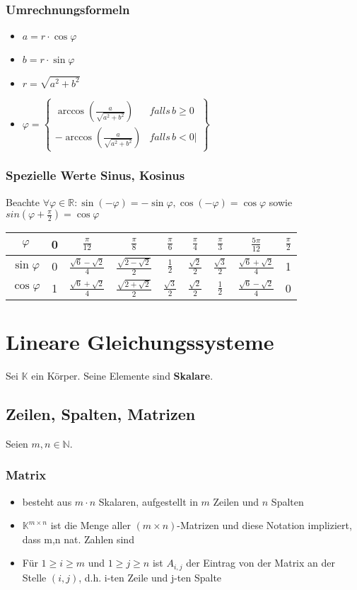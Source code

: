\documentclass[titlepage]{article}
\newcommand{\K}{\mathbb{K}}
\newcommand{\N}{\mathbb{N}}
\newcommand{\R}{\mathbb{R}}
\newcommand{\1}{\mathbb{1}}
\newcommand{\0}{\mathbb{0}}
\begin{document}
				\subsubsection{Umrechnungsformeln}
					\begin{itemize}
						\item $a=r\cdot\cos\varphi$
						\item $b=r\cdot\sin\varphi$
						\item $r=\sqrt{a^2+b^2}$
						\item $\varphi=\left\{\begin{matrix}
								\arccos(\frac{a}{\sqrt{a^2+b^2}})&falls\,b\ge0\\
								-\arccos(\frac{a}{\sqrt{a^2+b^2}})&falls\,b<0
|							\end{matrix}\right\}$
					\end{itemize}
				\subsubsection{Spezielle Werte Sinus, Kosinus}
					Beachte $\forall\varphi\in\R:\sin(-\varphi)=-\sin\varphi,\cos(-\varphi)=\cos\varphi$ sowie $sin(\varphi+\frac{\pi}{2})=\cos\varphi$
					\begin{table}[h]
						\begin{tabular}{c|c|c|c|c|c|c|c|c|}
							$\varphi$&0&$\frac{\pi}{12}$&$\frac{\pi}{8}$&$\frac{\pi}{6}$&$\frac{\pi}{4}$&$\frac{\pi}{3}$&$\frac{5\pi}{12}$&$\frac{\pi}{2}$\\\hline
							\rule{0pt}{20pt}$\sin\varphi$&0&$\frac{\sqrt{6}-\sqrt{2}}{4}$&$\frac{\sqrt{2-\sqrt{2}}}{2}$&$\frac{1}{2}$&$\frac{\sqrt{2}}{2}$&$\frac{\sqrt{3}}{2}$&$\frac{\sqrt{6}+\sqrt{2}}{4}$&1\\
							\rule{0pt}{20pt}$\cos\varphi$&1&$\frac{\sqrt{6}+\sqrt{2}}{4}$&$\frac{\sqrt{2+\sqrt{2}}}{2}$&$\frac{\sqrt{3}}{2}$&$\frac{\sqrt{2}}{2}$&$\frac{1}{2}$&$\frac{\sqrt{6}-\sqrt{2}}{4}$&0
						\end{tabular}
					\end{table}
		\section{Lineare Gleichungssysteme}
			Sei $\K$ ein Körper. Seine Elemente sind \textbf{Skalare}.
			\subsection{Zeilen, Spalten, Matrizen}
				Seien $m,n\in\N$.
				\subsubsection{Matrix}
					\begin{itemize}
						\item besteht aus $m\cdot n$ Skalaren, aufgestellt in $m$ Zeilen und $n$ Spalten
						\item $\K^{m\times n}$ ist die Menge aller $(m\times n)$-Matrizen und diese Notation impliziert, dass m,n nat. Zahlen sind
						\item Für $1\ge i\ge m$ und $1\ge j\ge n$ ist $A_{i,j}$ der Eintrag von der Matrix an der Stelle $(i,j)$, d.h. i-ten Zeile und j-ten Spalte 
					\end{itemize}
\end{document}
